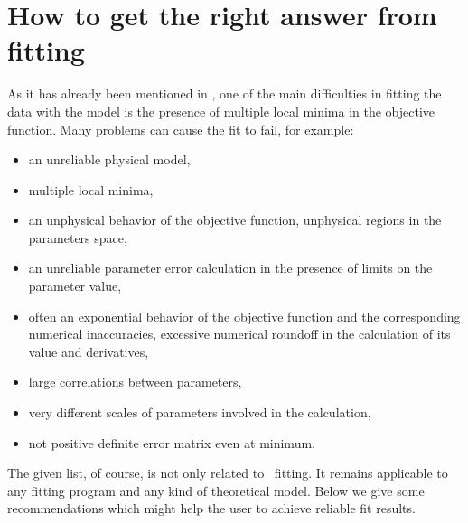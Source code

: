 \section {How to get the right answer from fitting} 

As it has already been mentioned in , 
one of the main difficulties in fitting the data with the model 
is the presence of multiple
local minima in the objective function. Many problems can cause the
fit to fail, for example:
\begin{itemize}
\item an unreliable physical model,
\item multiple local minima,
\item an unphysical behavior of the objective function, unphysical regions
  in the parameters space,
\item an unreliable parameter error calculation in the presence of
  limits on the parameter value,
\item often an exponential behavior of the objective function and the
  corresponding numerical inaccuracies, excessive numerical roundoff
  in the calculation of its value and derivatives,
\item large correlations between parameters,
\item very different scales of parameters involved in the calculation,
\item not positive definite error matrix even at minimum.
\end{itemize}


The given list, of course, is not only related to \BornAgain\
fitting. It remains applicable to any fitting program and any kind of theoretical model.
 Below we give some recommendations which might help the user to achieve reliable fit results.

